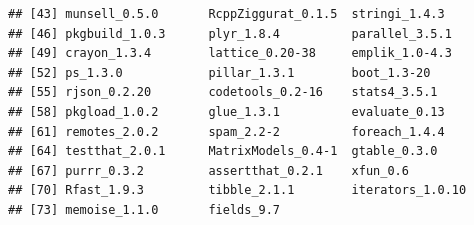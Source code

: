 \documentclass{article}\usepackage[]{graphicx}\usepackage[]{color}
\makeatletter
\newenvironment{kframe}{%
 \def\at@end@of@kframe{}%
 \ifinner\ifhmode%
  \def\at@end@of@kframe{\end{minipage}}%
  \begin{minipage}{\columnwidth}%
 \fi\fi%
 \def\FrameCommand##1{\hskip\@totalleftmargin \hskip-\fboxsep
 \colorbox{shadecolor}{##1}\hskip-\fboxsep
     \hskip-\linewidth \hskip-\@totalleftmargin \hskip\columnwidth}%
 \MakeFramed {\advance\hsize-\width
   \@totalleftmargin\z@ \linewidth\hsize
   \@setminipage}}%
 {\par\unskip\endMakeFramed%
 \at@end@of@kframe}
\newenvironment{knitrout}{}{} %
\makeatother
\begin{document}
\begin{knitrout}
\begin{kframe}
\begin{verbatim}
## [43] munsell_0.5.0       RcppZiggurat_0.1.5  stringi_1.4.3      
## [46] pkgbuild_1.0.3      plyr_1.8.4          parallel_3.5.1     
## [49] crayon_1.3.4        lattice_0.20-38     emplik_1.0-4.3     
## [52] ps_1.3.0            pillar_1.3.1        boot_1.3-20        
## [55] rjson_0.2.20        codetools_0.2-16    stats4_3.5.1       
## [58] pkgload_1.0.2       glue_1.3.1          evaluate_0.13      
## [61] remotes_2.0.2       spam_2.2-2          foreach_1.4.4      
## [64] testthat_2.0.1      MatrixModels_0.4-1  gtable_0.3.0       
## [67] purrr_0.3.2         assertthat_0.2.1    xfun_0.6           
## [70] Rfast_1.9.3         tibble_2.1.1        iterators_1.0.10   
## [73] memoise_1.1.0       fields_9.7
\end{verbatim}
\end{kframe}
\end{knitrout}
\end{document}
